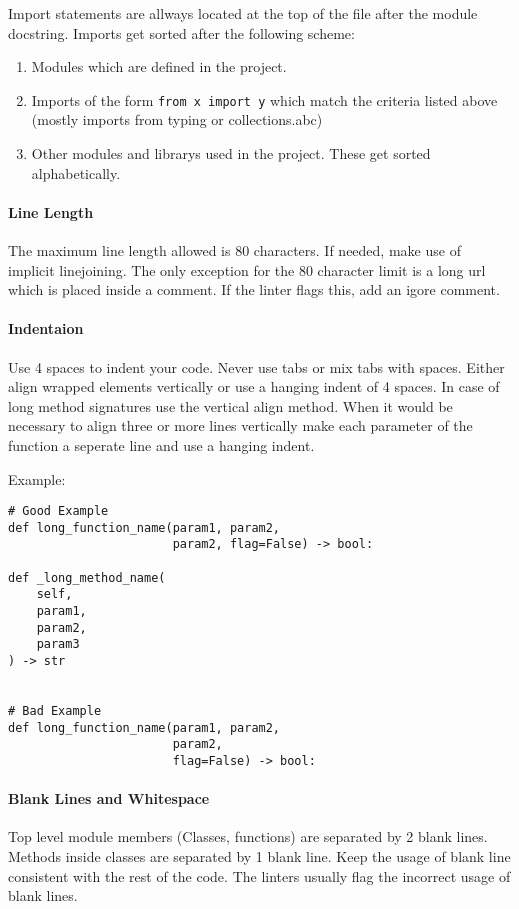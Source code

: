 Import statements are allways located at the top of the file after the module
docstring. Imports get sorted after the following scheme:

\begin{enumerate}
    \item Modules which are defined in the project. 
    \item Imports of the form \texttt{from x import y} which match the criteria
        listed above \\  (mostly imports from typing or collections.abc)
    \item Other modules and librarys used in the project. These get sorted
        alphabetically.
\end{enumerate}

\paragraph{Line Length} The maximum line length allowed is 80 characters. If
needed, make use of implicit linejoining. The only exception for the 80
character limit is a long url which is placed inside a comment. If the linter
flags this, add an igore comment.

\newpage

\paragraph{Indentaion} Use 4 spaces to indent your code. Never use tabs or
mix tabs with spaces. Either align wrapped elements vertically or use a hanging
indent of 4 spaces. In case of long method signatures use the vertical align
method. When it would be necessary to align three or more lines vertically
make each parameter of the function a seperate line and use a hanging indent.

Example:

\pythonstyle
\begin{lstlisting}[caption={Indentaion Example}]
# Good Example
def long_function_name(param1, param2,
                       param2, flag=False) -> bool:

def _long_method_name(
    self,
    param1,
    param2,
    param3
) -> str


# Bad Example
def long_function_name(param1, param2,
                       param2,
                       flag=False) -> bool:
\end{lstlisting}

\paragraph{Blank Lines and Whitespace} Top level module members
(Classes, functions) are separated by 2 blank lines. Methods inside classes are
separated by 1 blank line. Keep the usage of blank line consistent with the
rest of the code. The linters usually flag the incorrect usage of blank lines.

